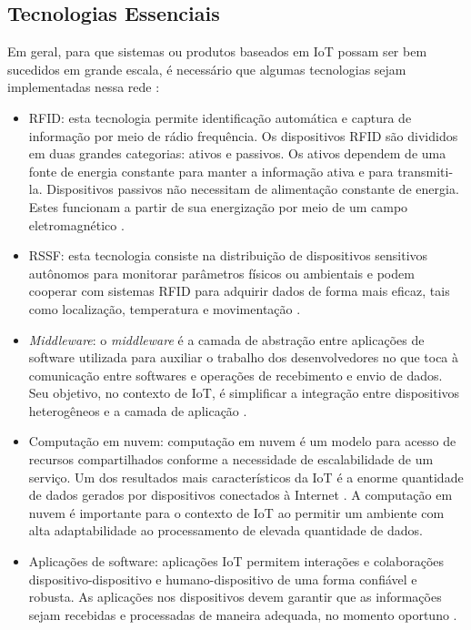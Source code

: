 \subsection{Tecnologias Essenciais}
\quad Em geral, para que sistemas ou produtos baseados em \acrlong{IoT} possam ser bem sucedidos em grande escala, é necessário que algumas tecnologias sejam implementadas nessa rede \cite{IOTA}:
		\begin{itemize}
			\item \acrfull{RFID}: esta tecnologia permite identificação automática e captura de informação por meio de rádio frequência.
			Os dispositivos \acrshort{RFID} são divididos em duas grandes categorias: ativos e passivos. Os ativos dependem
			de uma fonte de energia constante para manter a informação ativa e para transmiti-la. Dispositivos passivos não necessitam de alimentação constante de energia.
			Estes funcionam a partir de sua energização por meio de um campo eletromagnético \cite{refrfid}.

		\end{itemize}
		\begin{itemize}
			\item \acrfull{RSSF}: esta tecnologia consiste na distribuição de dispositivos sensitivos autônomos para monitorar parâmetros físicos ou
			ambientais e podem cooperar com sistemas \acrshort{RFID} para adquirir dados de forma mais eficaz, tais como localização, temperatura e movimentação \cite{IOTS}.
		\end{itemize}
		\begin{itemize}
			\item \textit{Middleware}: o \textit{middleware} é a camada de abstração entre aplicações de software utilizada para auxiliar o trabalho dos desenvolvedores
			 no que toca à comunicação entre softwares e operações de recebimento e envio de dados. Seu objetivo, no contexto
			  de \acrshort{IoT}, é simplificar a integração entre dispositivos heterogêneos e a camada de aplicação \cite{middleware}.
		\end{itemize}
		\begin{itemize}
			\item Computação em nuvem: computação em nuvem é um modelo para acesso de recursos compartilhados conforme a necessidade de escalabilidade de um serviço. Um dos resultados mais característicos
			da \acrshort{IoT} é a enorme quantidade de dados gerados por dispositivos conectados à Internet \cite{IOTV}. A computação em nuvem é importante para o contexto de \acrlong{IoT}
			ao permitir um ambiente com alta adaptabilidade ao processamento de elevada quantidade de dados.
		\end{itemize}
		\begin{itemize}
			\item Aplicações de software: aplicações \acrshort{IoT} permitem interações e colaborações dispositivo-dispositivo e humano-dispositivo de uma forma confiável e robusta.
			As aplicações nos dispositivos devem garantir que as informações sejam recebidas e processadas de maneira adequada, no momento oportuno \cite{service}.
		\end{itemize}

